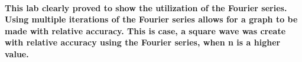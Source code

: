 \documentclass[12pt,a4paper]{article}
\begin{document}
\paragraph{This lab clearly proved to show the utilization of the Fourier series. Using multiple iterations of the Fourier series allows for a graph to be made with relative accuracy. This is case, a square wave was create with relative accuracy using the Fourier series, when n is a higher value.}






\end{document}
